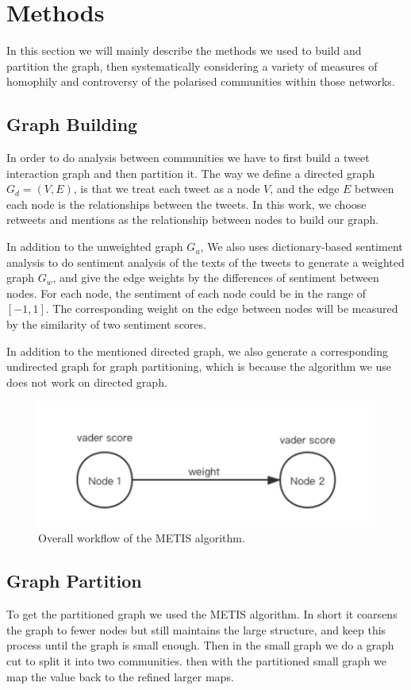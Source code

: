 \documentclass[sigplan,screen]{acmart}
\begin{document}
\section{Methods}\label{methods}
In this section we will mainly describe the methods we used to build and partition the graph, then systematically considering
a variety of measures of homophily and controversy of the polarised communities within those networks.
\subsection{Graph Building}
In order to do analysis between communities we have to first build a tweet interaction graph and then partition it. The way we define a directed graph $G_d = (V,E)$, is that we treat each tweet as a node $V$, and the edge $E$ between each node is the relationships between the tweets. In this work, we choose retweets and mentions as the relationship between nodes to build our graph.

In addition to the unweighted graph $G_u$, We also uses dictionary-based sentiment analysis to do sentiment analysis of the texts of the tweets to generate a weighted graph $G_w$, and give the edge weights by the differences of sentiment between nodes. For each node, the sentiment of each node could be in the range of $[-1,1]$. The corresponding weight on the edge between nodes will be measured by the similarity of two sentiment scores.

In addition to the mentioned directed graph, we also generate a corresponding undirected graph for graph partitioning, which is because the algorithm we use does not work on directed graph.
\begin{figure}[h]
  \centering
  \includegraphics[width=0.85\linewidth]{resource/jiayi/nodes.png}
  \caption{Overall workflow of the METIS algorithm. }
\end{figure}

\subsection{Graph Partition}
To get the partitioned graph we used the METIS algorithm. In short it coarsens the graph to fewer nodes but still maintains the large structure, and keep this process until the graph is small enough. Then in the small graph we do a graph cut to split it into two communities. then with the partitioned small graph we map the value back to the refined larger maps.
\end{document}
